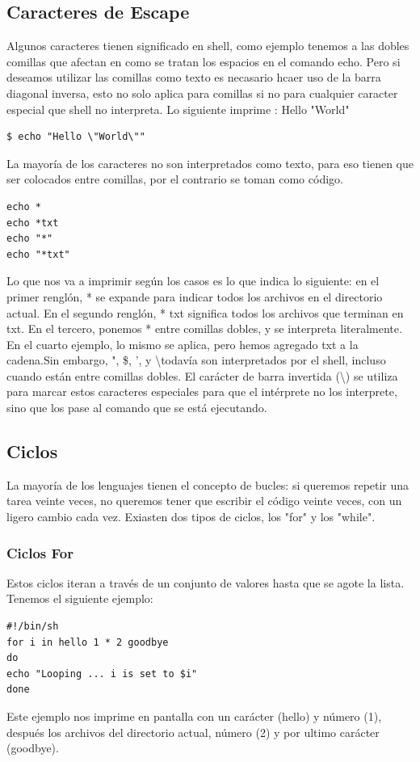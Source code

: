 \documentclass[12pt]{article}
\begin{document}
\subsection*{Caracteres de Escape}
Algunos caracteres tienen significado en shell, como ejemplo tenemos a las dobles comillas que afectan en como se tratan los espacios en el comando echo. Pero si deseamos utilizar las comillas como texto es necasario hcaer uso de la barra diagonal inversa, esto no solo aplica para comillas si no para cualquier caracter especial que shell no interpreta. Lo siguiente imprime : Hello "World"
\begin{verbatim}
$ echo "Hello \"World\""
\end{verbatim}
La mayoría de los caracteres no son interpretados como texto, para eso tienen que ser colocados entre comillas, por el contrario se toman como código.
\begin{verbatim}
echo * 
echo *txt
echo "*" 
echo "*txt"
\end{verbatim}
Lo que nos va a imprimir según los casos es lo que indica lo siguiente: en el primer renglón, * se expande para indicar todos los archivos en el directorio actual. En el segundo renglón, * txt significa todos los archivos que terminan en txt. En el tercero, ponemos * entre comillas dobles, y se interpreta literalmente. En el cuarto ejemplo, lo mismo se aplica, pero hemos agregado txt a la cadena.Sin embargo, ", \$, ', y \textbackslash  todavía son interpretados por el shell, incluso cuando están entre comillas dobles. El carácter de barra invertida (\textbackslash) se utiliza para marcar estos caracteres especiales para que el intérprete no los interprete, sino que los pase al comando que se está ejecutando.
 

\subsection*{Ciclos}
La mayoría de los lenguajes tienen el concepto de bucles: si queremos repetir una tarea veinte veces, no queremos tener que escribir el código veinte veces, con un ligero cambio cada vez. Exiasten dos tipos de ciclos, los "for" y los "while".
\subsubsection*{Ciclos For}
Estos ciclos iteran a través de un conjunto de valores hasta que se agote la lista. Tenemos el siguiente ejemplo:
\begin{verbatim}
#!/bin/sh
for i in hello 1 * 2 goodbye
do
echo "Looping ... i is set to $i"
done
\end{verbatim}
Este ejemplo nos imprime en pantalla con un carácter (hello) y número (1), después los archivos del directorio actual, número (2) y por ultimo carácter (goodbye).
\end{document}
